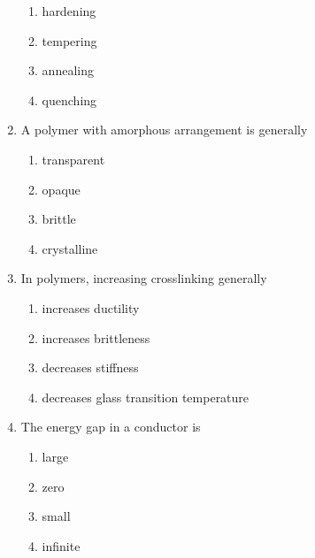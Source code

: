 \documentclass[journal,12pt,onecolumn]{IEEEtran}
\begin{document}
\begin{enumerate}[label=\arabic*)]
\vspace{0.2cm}
\begin{enumerate}[label=\alph*)]
\item hardening
\item tempering
\item annealing
\item quenching
\end{enumerate}
\vspace{0.5cm}

\item A polymer with amorphous arrangement is generally  
\hfill{} \\

\vspace{0.2cm}
\begin{enumerate}[label=\alph*)]
\item transparent
\item opaque
\item brittle
\item crystalline
\end{enumerate}

\newpage

\item In polymers, increasing crosslinking generally  
\hfill{} \\

\vspace{0.2cm}
\begin{enumerate}[label=\alph*)]
\item increases ductility
\item increases brittleness
\item decreases stiffness
\item decreases glass transition temperature
\end{enumerate}
\vspace{0.5cm}

\item The energy gap in a conductor is  
\hfill{} \\

\vspace{0.2cm}
\begin{enumerate}[label=\alph*)]
\item large
\item zero
\item small
\item infinite
\end{enumerate}
\vspace{0.5cm}


\end{enumerate}
\end{document}
